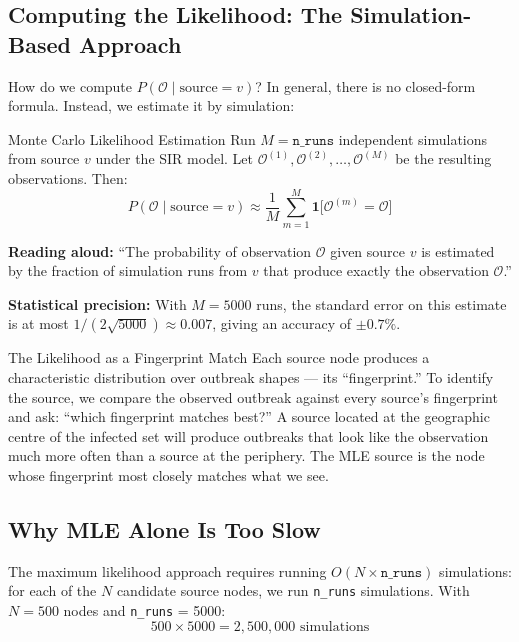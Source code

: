 \subsection{Computing the Likelihood: The Simulation-Based Approach}

How do we compute $P(\mathcal{O} \mid \text{source} = v)$? In general, there is no closed-form formula. Instead, we estimate it by simulation:

\begin{mathbox}{Monte Carlo Likelihood Estimation}
Run $M = \texttt{n\_runs}$ independent simulations from source $v$ under the SIR model. Let $\mathcal{O}^{(1)}, \mathcal{O}^{(2)}, \ldots, \mathcal{O}^{(M)}$ be the resulting observations. Then:
\begin{equation}
    P(\mathcal{O} \mid \text{source} = v) \approx \frac{1}{M} \sum_{m=1}^{M} \mathbf{1}\bigl[\mathcal{O}^{(m)} = \mathcal{O}\bigr]
    \label{eq:mc_likelihood}
\end{equation}

\textbf{Reading aloud:} ``The probability of observation $\mathcal{O}$ given source $v$ is estimated by the fraction of simulation runs from $v$ that produce exactly the observation $\mathcal{O}$.''

\textbf{Statistical precision:} With $M = 5000$ runs, the standard error on this estimate is at most $1/(2\sqrt{5000}) \approx 0.007$, giving an accuracy of $\pm 0.7\%$.
\end{mathbox}

\begin{analogybox}{The Likelihood as a Fingerprint Match}
Each source node produces a characteristic distribution over outbreak shapes --- its ``fingerprint.'' To identify the source, we compare the observed outbreak against every source's fingerprint and ask: ``which fingerprint matches best?'' A source located at the geographic centre of the infected set will produce outbreaks that look like the observation much more often than a source at the periphery. The MLE source is the node whose fingerprint most closely matches what we see.
\end{analogybox}

\subsection{Why MLE Alone Is Too Slow}

The maximum likelihood approach requires running $O(N \times \texttt{n\_runs})$ simulations: for each of the $N$ candidate source nodes, we run \texttt{n\_runs} simulations. With $N = 500$ nodes and \texttt{n\_runs} = 5000:
\[
500 \times 5000 = 2{,}500{,}000 \text{ simulations}
\]


